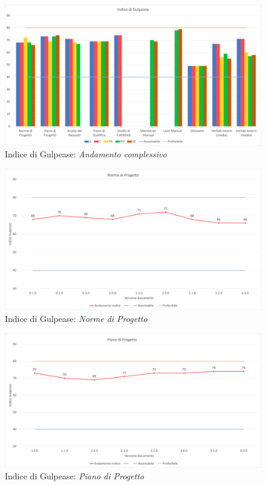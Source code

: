 \begin{figure}[!ht]
    \caption{Indice di Gulpease: \textit{Andamento complessivo}}
    \includegraphics[scale=0.5]{sezioni/immagini/GulpeaseGenerale.png}
    \centering
\end{figure}
\begin{figure}[!ht]
    \caption{Indice di Gulpease: \textit{Norme di Progetto}}
    \includegraphics[scale=0.5]{sezioni/immagini/NormeGulpease.png}
    \centering
\end{figure}
\pagebreak
\begin{figure}[!ht]
    \caption{Indice di Gulpease: \textit{Piano di Progetto}}
    \vspace{10px}
    \includegraphics[scale=0.5]{sezioni/immagini/PianoProgettoGulpease.png}
    \centering
\end{figure}
